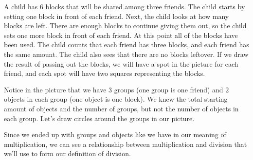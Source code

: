 \documentclass{ximera}
\begin{document}
A child has 6 blocks that will be shared among three friends. The child starts by setting one block in front of each friend. Next, the child looks at how many blocks are left. There are enough blocks to continue giving them out, so the child sets one more block in front of each friend. At this point all of the blocks have been used. The child counts that each friend has three blocks, and each friend has the same amount. The child also sees that there are no blocks leftover. If we draw the result of passing out the blocks, we will have a spot in the picture for each friend, and each spot will have two squares representing the blocks.
\begin{image}
\end{image}

Notice in the picture that we have $3$ groups (one group is one friend) and $2$ objects in each group (one object is one block). We knew the total starting amount of objects and the number of groups, but not the number of objects in each group. Let's draw circles around the groups in our picture.
\begin{image}
\end{image}


Since we ended up with groups and objects like we have in our meaning of multiplication, we can see a relationship between multiplication and division that we'll use to form our definition of division.
\end{document}
